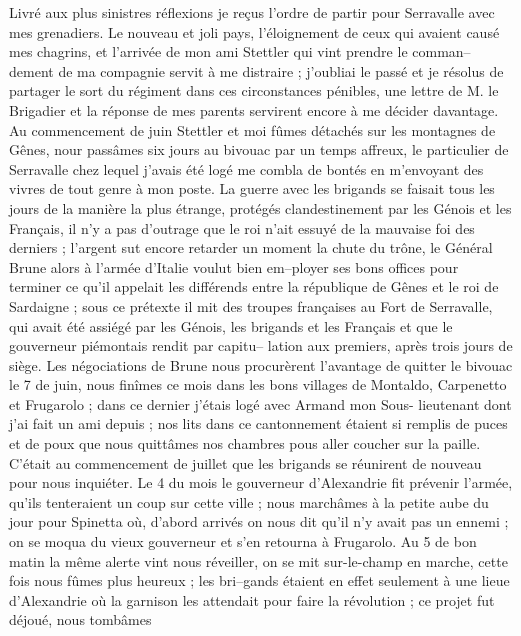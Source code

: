 \documentclass[12pt]{article}
\begin{document}
 Livré aux plus sinistres réflexions je reçus l’ordre de
partir pour Serravalle avec mes grenadiers. Le nouveau et joli pays, l’éloignement de ceux qui
avaient causé mes chagrins, et l’arrivée de mon ami Stettler qui vint prendre le comman–dement de ma
compagnie servit à me distraire ; j’oubliai le passé et je résolus de partager le sort du régiment
dans ces circonstances pénibles, une lettre de M. le Brigadier et la réponse de mes parents
servirent encore à me décider davantage. Au commencement de juin Stettler et moi fûmes détachés sur
les montagnes de Gênes, nour passâmes six jours au bivouac par un temps affreux, le particulier de
Serravalle chez lequel j’avais été logé me combla de bontés en m’envoyant des vivres de tout genre à
mon poste. La guerre avec les brigands se faisait tous les jours de la manière la plus étrange,
protégés clandestinement par les Génois et les Français, il n’y a pas d’outrage que le roi n’ait
essuyé de la mauvaise foi des derniers ; l’argent sut encore retarder un moment la chute du trône,
le Général Brune alors à l’armée d’Italie voulut bien em–ployer ses bons offices pour terminer ce
qu’il appelait les différends entre la république de Gênes et le roi de Sardaigne ; sous ce prétexte
il mit des troupes françaises au Fort de Serravalle, qui avait été assiégé par les Génois, les
brigands et les Français et que le gouverneur piémontais rendit par capitu– lation aux premiers,
après trois jours de siège. Les négociations de Brune nous procurèrent l’avantage de quitter le
bivouac le 7 de juin, nous finîmes ce mois dans les bons villages de Montaldo, Carpenetto et
Frugarolo ; dans ce dernier j’étais logé avec Armand mon Sous- lieutenant dont j’ai fait un ami
depuis ; nos lits dans ce cantonnement étaient si remplis de puces et de poux que nous quittâmes nos
chambres pous aller coucher sur la paille. C’était au commencement de juillet que les brigands se
réunirent de nouveau pour nous inquiéter. Le 4 du mois le gouverneur d’Alexandrie fit prévenir
l’armée, qu’ils tenteraient un coup sur cette ville ; nous marchâmes à la petite aube du jour pour
Spinetta où, d’abord arrivés on nous dit qu’il n’y avait pas un ennemi ; on se moqua du vieux
gouverneur et s’en retourna à Frugarolo. Au 5 de bon matin la même alerte vint nous réveiller, on se
mit sur-le-champ en marche, cette fois nous fûmes plus heureux ; les bri–gands étaient en effet
seulement à une lieue d’Alexandrie où la garnison les attendait pour faire la révolution ; ce projet
fut déjoué, nous tombâmes
\end{document}
